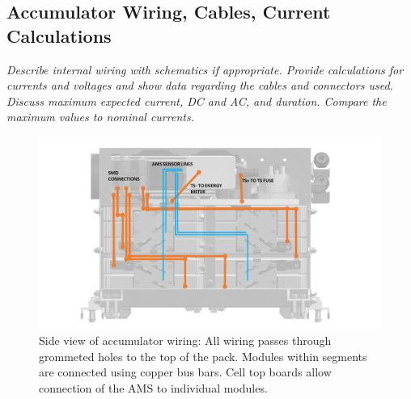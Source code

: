 \documentclass{article}
\begin{document}

\newpage

\subsection{Accumulator Wiring, Cables, Current Calculations}

    \textit{Describe internal wiring with schematics if appropriate. Provide calculations for currents and voltages and show data regarding the cables and connectors used. Discuss maximum expected current, DC and AC, and duration. Compare the maximum values to nominal currents.}

        \begin{figure}[H]
            \centering
            \includegraphics[width = 0.9 \textwidth]{ACCUMULATOR_WIRING_SIDE}
            \caption{Side view of accumulator wiring: All wiring passes through grommeted holes to the top of the pack. Modules within segments are connected using copper bus bars. Cell top boards allow connection of the AMS to individual modules.}
            \label{ACCUMULATOR_WIRING_SIDE}
        \end{figure}
\end{document}
